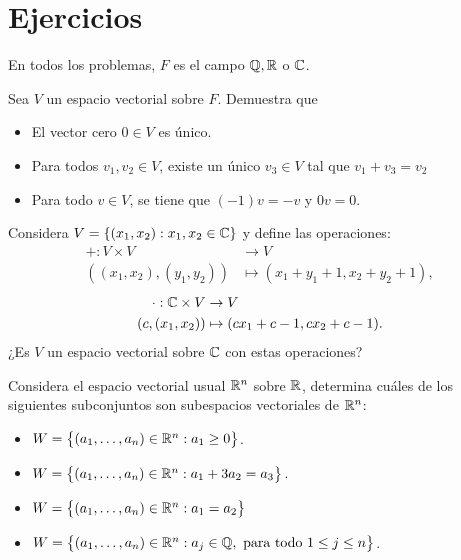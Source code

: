 \documentclass[12pt,a4paper]{book}
\newcommand{\llaves}[1]{\{#1\}}
\newcommand{\parentesis}[1]{\left(#1\right)}
\newcommand{\llavesgrande}[1]{\big\{#1\big\}}
\begin{document}
    \section{Ejercicios}

    En todos los problemas, $F$ es el campo $\mathbb{Q}, \mathbb{R}$ o $\mathbb{C}$.

    \begin{ejercicio}
        Sea $V$ un espacio vectorial sobre $F$. Demuestra que
        \begin{itemize}
            \item[(a)] El vector cero $0 \in V$ es único.
            \item[(b)] Para todos $v_{1}, v_{2} \in V$, existe un único $v_{3} \in V$ tal que $v_{1} + v_{3} = v_{2}$
            \item[(c)] Para todo $v \in V$, se tiene que $(-1)v = -v$ y $0v = 0$.
        \end{itemize}
    \end{ejercicio}

    \begin{ejercicio}
        Considera $V = \llaves{(x_{1},x_{2}) : x_{1},x_{2} \in \C}$ y define las operaciones:
        \begin{align*}
            + : V \times V & \to V\\
            \parentesis{(x_{1},x_{2}), (y_{1}, y_{2})} & \mapsto (x_{1} + y_{1} + 1, x_{2} + y_{2} + 1),
        \end{align*}
        \begin{align*}
            \cdot : \mathbb{C} \times V & \to V\\
            (c,(x_{1}, x_{2})) & \mapsto (cx_{1} + c - 1, cx_{2} + c - 1).
        \end{align*}
        ¿Es $V$ un espacio vectorial sobre $\mathbb{C}$ con estas operaciones?
    \end{ejercicio}

    \begin{ejercicio}
        Considera el espacio vectorial usual $\mathbb{R}^{n}$ sobre $\mathbb{R}$, determina cuáles de los siguientes subconjuntos son subespacios vectoriales de $\mathbb{R}^{n}$:
        \begin{itemize}
            \item[(a)] $W = \llavesgrande{(a_{1}, \dots , a_{n}) \in \R^{n}: a_{1} \geq 0}$.
            \item[(b)] $W = \llavesgrande{(a_{1}, \dots , a_{n}) \in \R^{n}:a_{1} + 3a_{2} = a_{3}}$.
            \item[(c)] $W = \llavesgrande{(a_{1}, \dots , a_{n}) \in \R^{n}:a_{1} = a_{2}}$
            \item[(d)] $W = \llavesgrande{(a_{1}, \dots , a_{n}) \in \R^{n}: a_{j} \in \Q, \text{ para todo }1 \leq j \leq n}$.
        \end{itemize}
    \end{ejercicio}
\end{document}

